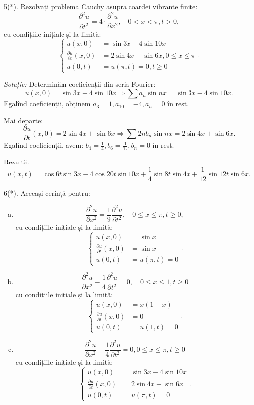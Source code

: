 \documentclass[11pt,a4paper]{article}
\theoremstyle{dotless}
\theoremstyle{dotlessdr}
\begin{document}
\vspace{1cm}

5(*). Rezolvați problema Cauchy asupra coardei vibrante finite:
\[
  \frac{\partial^2 u}{\partial t^2} = 4 \cdot \frac{\partial^2 u}{\partial x^2}, %
  \quad 0 < x < \pi, t > 0,
\]
cu condițiile inițiale și la limită:
\[
  \begin{cases}
    u(x, 0) &= \sin 3x - 4 \sin 10x \\
    \frac{\partial u}{\partial t}(x, 0) &= 2 \sin 4x + \sin 6x, 0 \leq x \leq \pi \\
    u(0, t) &= u(\pi, t) = 0, t \geq 0
  \end{cases}.
\]

\vspace{1cm}

\emph{Soluție:} Determinăm coeficienții din seria Fourier:
\[
  u(x, 0) = \sin 3x - 4\sin 10x \Rightarrow \sum a_n \sin nx = \sin 3x - 4 \sin 10x.
\]
Egalînd coeficienții, obținem $ a_3 = 1, a_{10} = -4, a_n = 0 $ în rest.

Mai departe:
\[
  \frac{\partial u}{\partial t}(x, 0) = 2\sin 4x + \sin 6x \Rightarrow %
  \sum 2nb_n \sin nx = 2\sin 4x + \sin 6x.
\]
Egalînd coeficienții, avem: $ b_4 = \frac{1}{4}, b_6 = \frac{1}{12}, b_n = 0 $ în rest.

Rezultă:
\[
  u(x, t) = \cos 6t \sin 3x - 4\cos 20t \sin 10x + \frac{1}{4} \sin 8t \sin 4x + %
  \frac{1}{12} \sin 12t \sin 6x.
\]

\vspace{1cm}

6(*). Aceeași cerință pentru:
\begin{enumerate}[(a)]
\item
  \[
    \frac{\partial^2 u}{\partial x^2} = \frac{1}{9}\frac{\partial^2 u}{\partial t^2}, %
    \quad 0 \leq x \leq \pi, t \geq 0,
  \]
  cu condițiile inițiale și la limită:
  \[
    \begin{cases}
      u(x, 0) &= \sin x \\
      \frac{\partial u}{\partial t}(x, 0) &= \sin x \\
      u(0, t) &= u(\pi, t) = 0
    \end{cases}.
  \]
\item
  \[
    \frac{\partial^2 u}{\partial x^2} - \frac{1}{4} \frac{\partial^2 u}{\partial t^2} = 0, %
    \quad 0 \leq x \leq 1, t \geq 0
  \]
  cu condițiile inițiale și la limită:
  \[
    \begin{cases}
      u(x, 0) &= x(1 - x) \\
      \frac{\partial u}{\partial t}(x, 0) &= 0 \\
      u(0, t) &= u(1, t) = 0
    \end{cases}.
  \]
\item
  \[
    \frac{\partial^2 u}{\partial x^2} - \frac{1}{4} \frac{\partial^2 u}{\partial t^2} = 0, %
    0 \leq x \leq \pi, t \geq 0
  \]
  cu condițiile inițiale și la limită:
  \[
    \begin{cases}
      u(x, 0) &= \sin 3x - 4\sin 10x \\
      \frac{\partial u}{\partial t}(x, 0) &= 2 \sin 4x + \sin 6x \\
      u(0, t) &= u(\pi, t) = 0
    \end{cases}.
  \]
\end{enumerate}
\end{document}
